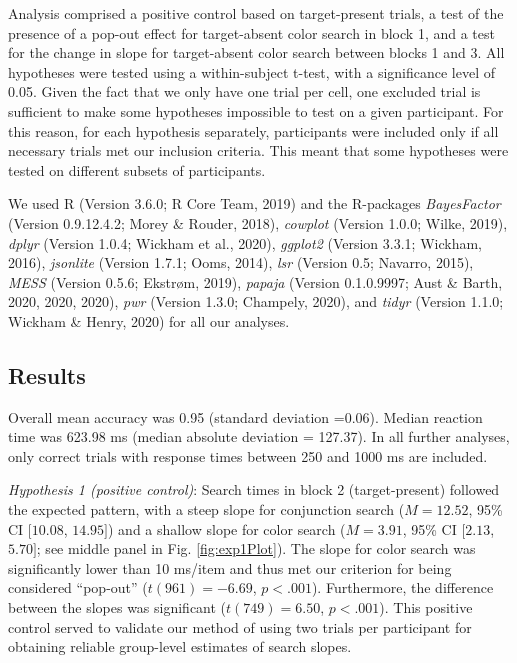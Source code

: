 \documentclass[
  english,
  man]{apa6}
\begin{document}
Analysis comprised a positive control based on target-present trials, a test of the presence of a pop-out effect for target-absent color search in block 1, and a test for the change in slope for target-absent color search between blocks 1 and 3. All hypotheses were tested using a within-subject t-test, with a significance level of 0.05.
Given the fact that we only have one trial per cell, one excluded trial is sufficient to make some hypotheses impossible to test on a given participant. For this reason, for each hypothesis separately, participants were included only if all necessary trials met our inclusion criteria. This meant that some hypotheses were tested on different subsets of participants.

We used R (Version 3.6.0; R Core Team, 2019) and the R-packages \emph{BayesFactor} (Version 0.9.12.4.2; Morey \& Rouder, 2018), \emph{cowplot} (Version 1.0.0; Wilke, 2019), \emph{dplyr} (Version 1.0.4; Wickham et al., 2020), \emph{ggplot2} (Version 3.3.1; Wickham, 2016), \emph{jsonlite} (Version 1.7.1; Ooms, 2014), \emph{lsr} (Version 0.5; Navarro, 2015), \emph{MESS} (Version 0.5.6; Ekstrøm, 2019), \emph{papaja} (Version 0.1.0.9997; Aust \& Barth, 2020, 2020, 2020), \emph{pwr} (Version 1.3.0; Champely, 2020), and \emph{tidyr} (Version 1.1.0; Wickham \& Henry, 2020) for all our analyses.

\hypertarget{results}{%
\subsection{Results}\label{results}}

Overall mean accuracy was 0.95 (standard deviation =0.06). Median reaction time was 623.98 ms (median absolute deviation = 127.37). In all further analyses, only correct trials with response times between 250 and 1000 ms are included.

\emph{Hypothesis 1 (positive control)}: Search times in block 2 (target-present) followed the expected pattern, with a steep slope for conjunction search (\(M = 12.52\), 95\% CI \([10.08\), \(14.95]\)) and a shallow slope for color search (\(M = 3.91\), 95\% CI \([2.13\), \(5.70]\); see middle panel in Fig. \ref{fig:exp1Plot}). The slope for color search was significantly lower than 10 ms/item and thus met our criterion for being considered \enquote{pop-out} (\(t(961) = -6.69\), \(p < .001\)). Furthermore, the difference between the slopes was significant (\(t(749) = 6.50\), \(p < .001\)). This positive control served to validate our method of using two trials per participant for obtaining reliable group-level estimates of search slopes.
\end{document}
